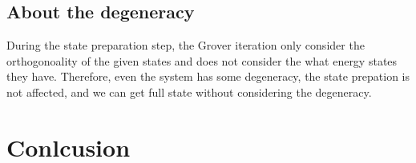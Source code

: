 \documentclass[twocolumn]{article}
\begin{document}

\subsection{About the degeneracy}

During the state preparation step, 
the Grover iteration only consider the orthogonoality of the given states 
and does not consider the what energy states they have. 
Therefore, even the system has some degeneracy, the state prepation is not affected,
and we can get full state without considering the degeneracy. 

\section{Conlcusion}


%  
%  

%
%
%
%
%


\end{document}
